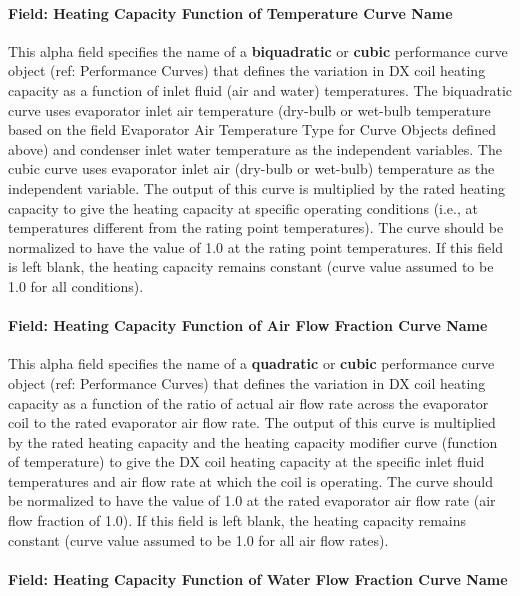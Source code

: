 \paragraph{Field: Heating Capacity Function of Temperature Curve Name}\label{field-heating-capacity-function-of-temperature-curve-name-1}

This alpha field specifies the name of a \textbf{biquadratic} or \textbf{cubic} performance curve object (ref: Performance Curves) that defines the variation in DX coil heating capacity as a function of inlet fluid (air and water) temperatures. The biquadratic curve uses evaporator inlet air temperature (dry-bulb or wet-bulb temperature based on the field Evaporator Air Temperature Type for Curve Objects defined above) and condenser inlet water temperature as the independent variables. The cubic curve uses evaporator inlet air (dry-bulb or wet-bulb) temperature as the independent variable. The output of this curve is multiplied by the rated heating capacity to give the heating capacity at specific operating conditions (i.e., at temperatures different from the rating point temperatures). The curve should be normalized to have the value of 1.0 at the rating point temperatures. If this field is left blank, the heating capacity remains constant (curve value assumed to be 1.0 for all conditions).

\paragraph{Field: Heating Capacity Function of Air Flow Fraction Curve Name}\label{field-heating-capacity-function-of-air-flow-fraction-curve-name}

This alpha field specifies the name of a \textbf{quadratic} or \textbf{cubic} performance curve object (ref: Performance Curves) that defines the variation in DX coil heating capacity as a function of the ratio of actual air flow rate across the evaporator coil to the rated evaporator air flow rate. The output of this curve is multiplied by the rated heating capacity and the heating capacity modifier curve (function of temperature) to give the DX coil heating capacity at the specific inlet fluid temperatures and air flow rate at which the coil is operating. The curve should be normalized to have the value of 1.0 at the rated evaporator air flow rate (air flow fraction of 1.0). If this field is left blank, the heating capacity remains constant (curve value assumed to be 1.0 for all air flow rates).

\paragraph{Field: Heating Capacity Function of Water Flow Fraction Curve Name}\label{field-heating-capacity-function-of-water-flow-fraction-curve-name}

